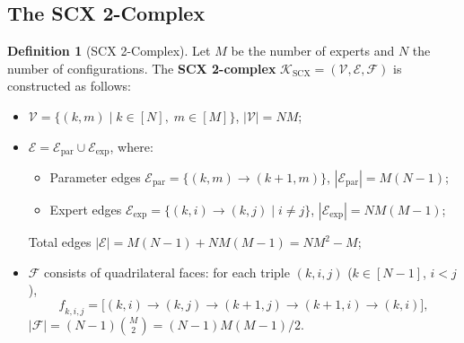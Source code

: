 \documentclass[12pt,a4paper]{article}
\theoremstyle{definition}
\newtheorem{definition}{Definition}[section]
\theoremstyle{remark}
\theoremstyle{definition}
\newcommand{\verts}{\mathcal{V}}
\newcommand{\edgs}{\mathcal{E}}
\newcommand{\faces}{\mathcal{F}}
\newcommand{\face}{\ensuremath{\mathit{f}}}
\begin{document}
\subsection{The SCX 2-Complex}

\begin{definition}[SCX 2-Complex]\label{def:scx_2complex}
Let $M$ be the number of experts and $N$ the number of configurations. The \textbf{SCX 2-complex} $\mathcal{K}_{\text{SCX}} = (\verts, \edgs, \faces)$ is constructed as follows:

\begin{itemize}
    \item $\verts = \{(k, m) \mid k \in [N],\; m \in [M]\}$, $|\verts| = NM$;
    \item $\edgs = \edgs_{\text{par}} \cup \edgs_{\text{exp}}$, where:
    \begin{itemize}
        \item Parameter edges $\edgs_{\text{par}} = \{(k,m) \to (k+1,m)\}$, $|\edgs_{\text{par}}| = M(N-1)$;
        \item Expert edges $\edgs_{\text{exp}} = \{(k,i) \to (k,j) \mid i \neq j\}$, $|\edgs_{\text{exp}}| = N M(M-1)$;
    \end{itemize}
    Total edges $|\edgs| = M(N-1) + NM(M-1) = NM^2 - M$;
    \item $\faces$ consists of quadrilateral faces: for each triple $(k, i, j)$ ($k \in [N-1]$, $i < j$),
    \[
        \face_{k,i,j} = \big[ (k,i) \to (k,j) \to (k+1,j) \to (k+1,i) \to (k,i) \big],
    \]
    $|\faces| = (N-1)\binom{M}{2} = (N-1)M(M-1)/2$.
\end{itemize}
\end{definition}
\end{document}
